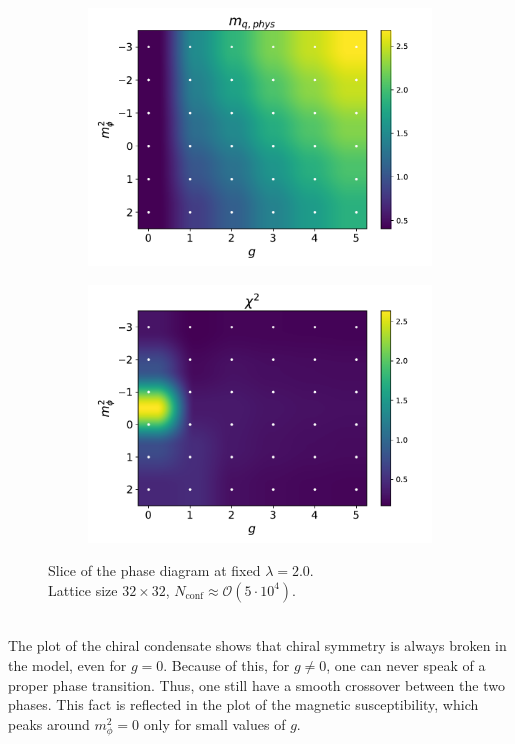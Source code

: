 \begin{figure}[htp]
\begin{subfigure}[b]{0.47\textwidth}
        \includegraphics[width=\textwidth]{figures/phase_diagram/g-m/phase_diagram_mqphys.pdf}
    \end{subfigure}
    \begin{subfigure}[b]{0.47\textwidth}
        \includegraphics[width=\textwidth]{figures/phase_diagram/g-m/phase_diagram_chi2.pdf}
    \end{subfigure}
    \caption{Slice of the phase diagram at fixed $\lambda = 2.0$. \\ Lattice size $32 \times 32$, $N_\text{conf} \approx \mathcal{O}(5 \cdot 10^4)$.}
    \label{fig:phase_diagram_g_m}
\end{figure}\\
The plot of the chiral condensate shows that chiral symmetry is always broken in the model, even for $g=0$. Because of this, for $g \neq 0$, one can never speak of a proper phase transition. Thus, one still have a smooth crossover between the two phases. This fact is reflected in the plot of the magnetic susceptibility, which peaks around $m_\phi^2 = 0$ only for small values of $g$. \\
